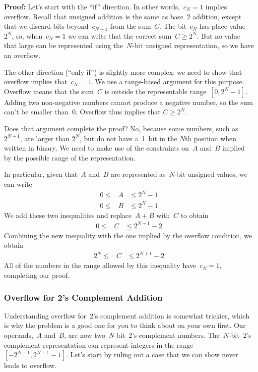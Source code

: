 \pagebreak

{\bf Proof:}
%
Let's start with the ``if'' direction.  In other words,~$c_N=1$ implies
overflow.  Recall that unsigned addition is the same as base~2 addition,
except that we discard bits beyond~$c_{N-1}$ from the sum~$C$.
The bit~$c_N$ has place value~$2^N$, so, when~$c_N=1$ we can write that 
the correct sum~$C\geq{2^N}$.  But no value that large can be represented
using the~\mbox{$N$-bit} unsigned representation, so we have an overflow.

The other direction (``only if'') is slightly more complex: we need to
show that overflow implies that~$c_N=1$.  We use a range-based argument
for this purpose.  Overflow means that the sum~$C$ is outside the
representable range~$[0,2^N-1]$.  Adding two non-negative numbers cannot
produce a negative number, so the sum can't be smaller than~0.  Overflow 
thus implies that $C\geq{2^N}$.

Does that argument complete the proof?  No, because some numbers, such 
as $2^{N+1}$, are larger than $2^N$, but do not have a~1~bit in the $N$th
position when written in binary.  We need to make use of the constraints
on~$A$ and~$B$ implied by the possible range of the representation.

In particular, given that~$A$ and~$B$ are represented as~\mbox{$N$-bit}
unsigned values, we can write
%
\begin{eqnarray*}
0 \leq & A & \leq 2^N - 1\\
0 \leq & B & \leq 2^N - 1
\end{eqnarray*}
%
We add these two inequalities and replace~$A+B$ with~$C$ to obtain
%
\begin{eqnarray*}
0 \leq & C & \leq 2^{N + 1} - 2
\end{eqnarray*}
%
Combining the new inequality with the one implied by the overflow 
condition, we obtain
%
\begin{eqnarray*}
2^N \leq & C & \leq 2^{N + 1} - 2
\end{eqnarray*}
%
All of the numbers in the range allowed by this inequality have~$c_N=1$,
completing our proof.\\

\subsubsection{Overflow for 2's Complement Addition}

Understanding overflow for~2's complement addition is somewhat trickier,
which is why the problem is a good one for you to think about on your
own first.
%
Our operands,~$A$ and~$B$, are now two~\mbox{$N$-bit}~2's complement numbers.
The~\mbox{$N$-bit}~2's complement representation 
can represent integers in the range~$[-2^{N-1},2^{N-1}-1]$.
%
Let's start by ruling out a case that we can show never leads to overflow.

